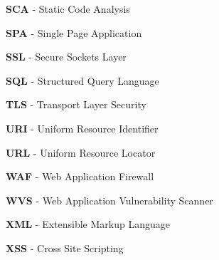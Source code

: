 \documentclass[12pt,oneside,a4paper,parskip]{scrbook}
\begin{document}
  \textbf{SCA} - Static Code Analysis

  \textbf{SPA} - Single Page Application

  \textbf{SSL} - Secure Sockets Layer

  \textbf{SQL} - Structured Query Language

  \textbf{TLS} - Transport Layer Security

  \textbf{URI} - Uniform Resource Identifier

  \textbf{URL} - Uniform Resource Locator

  \textbf{WAF} - Web Application Firewall

  \textbf{WVS} - Web Application Vulnerability Scanner

  \textbf{XML} - Extensible Markup Language

  \textbf{XSS} - Cross Site Scripting
  \newpage
\end{document}
